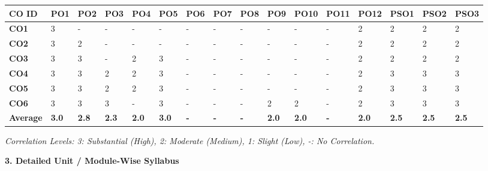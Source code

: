 \documentclass[10pt,a4paper]{article}
\begin{document}
\begin{table}[h!]
\centering
\small
\begin{tabularx}{\textwidth}{C{1.4cm} *{12}{Z} | *{3}{Z}}
\toprule
{}
\textbf{CO ID} & \textbf{PO1} & \textbf{PO2} & \textbf{PO3} & \textbf{PO4} & \textbf{PO5} & \textbf{PO6} & \textbf{PO7} & \textbf{PO8} & \textbf{PO9} & \textbf{PO10} & \textbf{PO11} & \textbf{PO12} & \textbf{PSO1} & \textbf{PSO2} & \textbf{PSO3} \\
\midrule
\textbf{CO1} & 
3 & - & - & - & - & - & - & - & - & - & - & 2 & 2 & 2 & 2 \\
\textbf{CO2} & 
3 & 2 & - & - & - & - & - & - & - & - & - & 2 & 2 & 2 & 2 \\
\textbf{CO3} & 
3 & 3 & - & 2 & 3 & - & - & - & - & - & - & 2 & 2 & 2 & 2 \\
\textbf{CO4} & 
3 & 3 & 2 & 2 & 3 & - & - & - & - & - & - & 2 & 3 & 3 & 3 \\
\textbf{CO5} & 
3 & 3 & 2 & 2 & 3 & - & - & - & - & - & - & 2 & 3 & 3 & 3 \\
\textbf{CO6} & 
3 & 3 & 3 & - & 3 & - & - & - & 2 & 2 & - & 2 & 3 & 3 & 3 \\
\midrule
{}
\textbf{Average} & 
\textbf{3.0} & \textbf{2.8} & \textbf{2.3} & \textbf{2.0} & \textbf{3.0} & \textbf{-} & \textbf{-} & \textbf{-} & \textbf{2.0} & \textbf{2.0} & \textbf{-} & \textbf{2.0} & \textbf{2.5} & \textbf{2.5} & \textbf{2.5} \\
\bottomrule
\end{tabularx}
\end{table}

\footnotesize\textit{Correlation Levels: 3: Substantial (High), 2: Moderate (Medium), 1: Slight (Low), -: No Correlation.}
\normalsize

\vspace{8pt}
{\large\textbf{\color{nbaNavy}3. Detailed Unit / Module-Wise Syllabus}}
\end{document}
